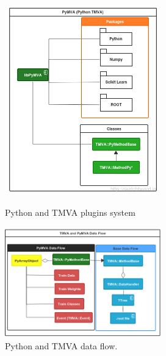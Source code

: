 \documentclass[a4paper]{jpconf}
\begin{document}
\begin{figure}[h]
\centering
\begin{minipage}{15pc}
\includegraphics[width=16pc]{img/pymvaplugins.png}
\caption{\label{pymvaplug}Python and TMVA plugins system}
\end{minipage}\hspace{2pc}%
\begin{minipage}{15pc}
\includegraphics[width=16pc]{img/pymvadf.png}
\caption{\label{pymvadf}Python and TMVA data flow.}
\end{minipage}\hspace{2pc}%
\end{figure}
\end{document}
